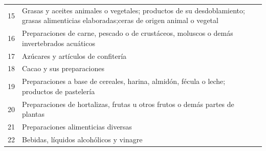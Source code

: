 \documentclass[a4paper,openright,12pt]{book}
\begin{document}
\begin{table}[]
{\begin{tabular}{@{}ll@{}}
    15  & Grasas y aceites animales o vegetales; productos de su desdoblamiento; grasas alimenticias elaboradas;ceras de origen animal o vegetal                                                                                                                                                         \\
    16  & Preparaciones de carne, pescado o de crustáceos, moluscos o demás invertebrados acuáticos                                                                                                                                                                                                      \\
    17  & Azúcares y artículos de confitería                                                                                                                                                                                                                                                             \\
    18  & Cacao y sus preparaciones                                                                                                                                                                                                                                                                      \\
    19  & Preparaciones a base de cereales, harina, almidón, fécula o leche; productos de pastelería                                                                                                                                                                                                     \\
    20  & Preparaciones de hortalizas, frutas u otros frutos o demás partes de plantas                                                                                                                                                                                                                   \\
    21  & Preparaciones alimenticias diversas                                                                                                                                                                                                                                                            \\
    22  & Bebidas, líquidos alcohólicos y vinagre                                                                                                                                                                                                                                                        \\

\end{tabular}}
\end{table}
\end{document}
